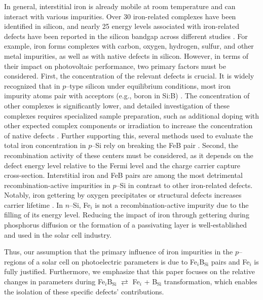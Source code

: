 \documentclass[a4paper,fleqn]{cas-sc}
\begin{document}
In general, interstitial iron is already mobile at room temperature and can interact with various impurities.
Over 30 iron-related complexes have been identified in silicon,
and nearly 25 energy levels associated with iron-related defects have been reported in the silicon bandgap across different studies \cite{Istratov1999,Gwozdz2022,JYOTHI2015}.
For example, iron forms complexes with carbon, oxygen, hydrogen, sulfur, and other metal impurities, as well as with native defects in silicon.
However, in terms of their impact on photovoltaic performance, two primary factors must be considered.
First, the concentration of the relevant defects is crucial.
It is widely recognized that in $p$--type silicon under equilibrium conditions, most iron impurity atoms pair with acceptors
(e.g., boron in Si:B) \cite{Kimerling1983,Istratov1999}.
The concentration of other complexes is significantly lower,
and detailed investigation of these complexes requires specialized sample preparation,
such as additional doping with other expected complex components
or irradiation to increase the concentration of native defects \cite{Tang2013}.
Further supporting this, several methods used to evaluate the total iron concentration in $p$--Si rely on breaking the FeB pair \cite{Zoth1990,FeMethod2012,Olikh2021JAP}.
Second, the recombination activity of these centers must be considered,
as it depends on the defect energy level relative to the Fermi level and the charge carrier capture cross-section.
Interstitial iron and FeB pairs are among the most detrimental recombination-active impurities in $p$--Si \cite{Istratov1999,TeimurazJAP} in contrast to other iron-related defects.
Notably, iron gettering by oxygen precipitates or structural defects increases carrier lifetime \cite{Schoen2011,FeB:Vahanissi}.
In $n$--Si, Fe$_i$ is not a recombination-active impurity due to the filling of its energy level.
Reducing the impact of iron through gettering during phosphorus diffusion \cite{Schoen2011,FeB:Vahanissi,Vaehaenissi2017} or the formation of a
passivating layer \cite{Teimuraz2014JAP} is well-established and used in the solar cell industry.

Thus, our assumption that the primary influence of iron impurities in the $p$--regions of a solar cell on photoelectric parameters is due to
Fe$_i$B$_\mathrm{Si}$ pairs and Fe$_i$ is fully justified.
Furthermore, we emphasize that this paper focuses on the relative changes in parameters during
Fe$_i$B$_\mathrm{Si}$ $\rightleftarrows$ Fe$_i$ + B$_\mathrm{Si}$ transformation, which enables the isolation of these specific defects' contributions.
\end{document}
